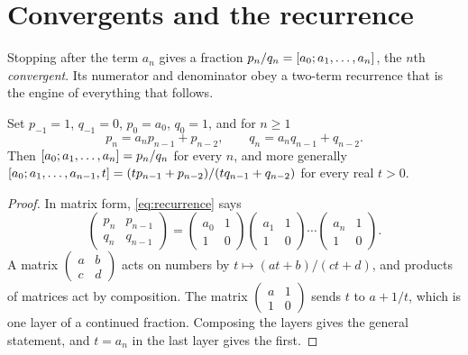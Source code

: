 \section{Convergents and the recurrence}

Stopping after the term $a_n$ gives a fraction $p_n/q_n = [a_0; a_1, \dots, a_n]$, the $n$th \emph{convergent}. Its numerator and denominator obey a two-term recurrence that is the engine of everything that follows.

\begin{proposition}\label{prop:recurrence}
Set $p_{-1} = 1$, $q_{-1} = 0$, $p_0 = a_0$, $q_0 = 1$, and for $n \ge 1$
\begin{equation}\label{eq:recurrence}
  p_n = a_n p_{n-1} + p_{n-2}, \qquad q_n = a_n q_{n-1} + q_{n-2}.
\end{equation}
Then $[a_0; a_1, \dots, a_n] = p_n/q_n$ for every $n$, and more generally $[a_0; a_1, \dots, a_{n-1}, t] = (t p_{n-1} + p_{n-2})/(t q_{n-1} + q_{n-2})$ for every real $t > 0$.
\end{proposition}

\begin{proof}
In matrix form, \eqref{eq:recurrence} says
\begin{equation}\label{eq:matrix}
  \begin{pmatrix} p_n & p_{n-1} \\ q_n & q_{n-1} \end{pmatrix}
  = \begin{pmatrix} a_0 & 1 \\ 1 & 0 \end{pmatrix}
    \begin{pmatrix} a_1 & 1 \\ 1 & 0 \end{pmatrix} \cdots
    \begin{pmatrix} a_n & 1 \\ 1 & 0 \end{pmatrix}.
\end{equation}
A matrix $\left(\begin{smallmatrix} a & b \\ c & d\end{smallmatrix}\right)$ acts on numbers by $t \mapsto (at + b)/(ct + d)$, and products of matrices act by composition. The matrix $\left(\begin{smallmatrix} a & 1 \\ 1 & 0\end{smallmatrix}\right)$ sends $t$ to $a + 1/t$, which is one layer of a continued fraction. Composing the layers gives the general statement, and $t = a_n$ in the last layer gives the first.
\end{proof}

